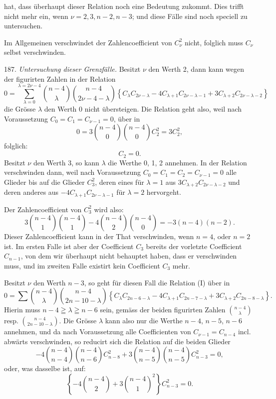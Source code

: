 \documentclass[11pt]{article}
\providecommand{\weberpage}[1]{}
\providecommand{\weq}[2]{\begin{equation}\tag{#1}#2\end{equation}}
\begin{document}
\weberpage{208}
hat, dass \"uberhaupt dieser Relation noch eine Bedeutung zukommt.
Dies trifft nicht mehr ein, wenn $\nu = 2, 3, n-2, n-3$; und diese
F\"alle sind noch speciell zu untersuchen.

Im Allgemeinen verschwindet der Zahlencoefficient von $C_\nu^2$
nicht, folglich muss $C_\nu$ selbst verschwinden.

187. \textit{Untersuchung dieser Grenzf\"alle.} Besitzt $\nu$ den
Werth 2, dann kann wegen der figurirten Zahlen in der Relation
\weq{I}{0 = \sum_{\lambda=0}^{\lambda=2\nu-4}\binom{n-4}{\lambda}\binom{n-4}{2\nu-4-\lambda}\left\{C_\lambda C_{2\nu-\lambda} - 4C_{\lambda+1}C_{2\nu-\lambda-1} + 3C_{\lambda+2}C_{2\nu-\lambda-2}\right\}}
die Gr\"osse $\lambda$ den Werth 0 nicht \"ubersteigen. Die Relation
geht also, weil nach Voraussetzung $C_0 = C_1 = C_{\nu-1} = 0$,
\"uber in
\[
0 = 3\binom{n-4}{0}\binom{n-4}{0}C_2^2 = 3C_2^2,
\]
folglich:
\[
C_2 = 0.
\]
Besitzt $\nu$ den Werth 3, so kann $\lambda$ die Werthe 0, 1, 2
annehmen. In der Relation verschwinden dann, weil nach Voraussetzung
$C_0 = C_1 = C_2 = C_{\nu-1} = 0$ alle Glieder bis auf die Glieder
$C_3^2$, deren eines f\"ur $\lambda = 1$ aus $3C_{\lambda+2}C_{2\nu-\lambda-2}$
und deren anderes aus $-4C_{\lambda+1}C_{2\nu-\lambda-1}$ f\"ur
$\lambda = 2$ hervorgeht.

Der Zahlencoefficient von $C_3^2$ wird also:
\[
3\binom{n-4}{1}\binom{n-4}{1} - 4\binom{n-4}{2}\binom{n-4}{0} = -3(n-4)(n-2).
\]
Dieser Zahlencoefficient kann in der That verschwinden, wenn $n = 4$,
oder $n = 2$ ist. Im ersten Falle ist aber der Coefficient $C_3$
bereits der vorletzte Coefficient $C_{n-1}$, von dem wir \"uberhaupt
nicht behauptet haben, dass er verschwinden muss, und im zweiten
Falle existirt kein Coefficient $C_3$ mehr.

Besitzt $\nu$ den Werth $n-3$, so geht f\"ur diesen Fall die Relation
(I) \"uber in
\[
0 = \sum \binom{n-4}{\lambda}\binom{n-4}{2n-10-\lambda}\left\{C_\lambda C_{2n-6-\lambda} - 4C_{\lambda+1}C_{2n-7-\lambda} + 3C_{\lambda+2}C_{2n-8-\lambda}\right\}.
\]
Hierin muss $n-4 \geqq \lambda \geqq n-6$ sein, gem\"ass der beiden
figurirten Zahlen $\binom{n-4}{\lambda}$ resp.
$\binom{n-4}{2n-10-\lambda}$. Die Gr\"osse $\lambda$ kann also nur
die Werthe $n-4$, $n-5$, $n-6$ annehmen, und da nach Voraussetzung
alle Coefficienten von $C_{\nu-1} = C_{n-4}$ incl. abw\"arts
verschwinden, so reducirt sich die Relation auf die beiden Glieder
\[
-4\binom{n-4}{n-4}\binom{n-4}{n-6}C_{n-8}^2 + 3\binom{n-4}{n-5}\binom{n-4}{n-5}C_{n-3}^2 = 0,
\]
oder, was dasselbe ist, auf:
\[
\left\{-4\binom{n-4}{2} + 3\binom{n-4}{1}^2\right\}C_{n-3}^2 = 0.
\]
\end{document}
